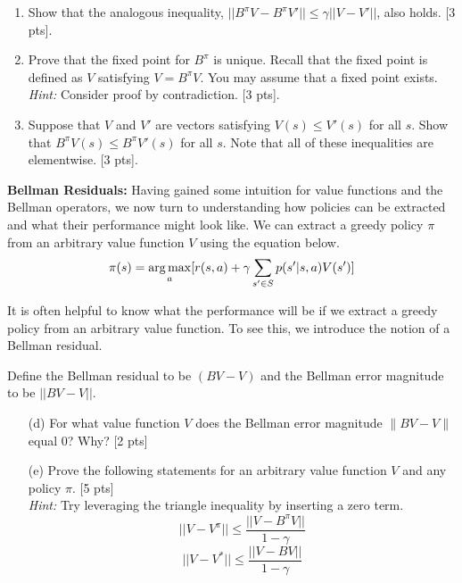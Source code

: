 \begin{enumerate}[label=(\alph*)]
    \item Show that the analogous inequality, $|| B^\pi V - B^\pi V' || \leq \gamma ||V - V'||$, also holds. [3 pts].
    
    \item Prove that the fixed point for $B^\pi$ is unique. Recall that the fixed point is defined as $V$ satisfying $V = B^\pi V$. You may assume that a fixed point exists. \textit{Hint:} Consider proof by contradiction. [3 pts].
    
    \item Suppose that $V$ and $V'$ are vectors satisfying $V(s) \leq V'(s)$ for all $s$. Show that $B^\pi V(s) \leq B^\pi V'(s)$ for all $s$. Note that all of these inequalities are elementwise. [3 pts].


\end{enumerate}




\noindent \textbf{Bellman Residuals:} Having gained some intuition for value functions and the Bellman operators, we now turn to understanding how policies can be extracted and what their performance might look like. We can extract a greedy policy $\pi$ from an arbitrary value function $V$ using the equation below. 
\begin{equation}
    \pi(s) = \operatorname*{arg\,max}_{a} [{r(s,a) + \gamma\sum_{s' \in S}p(s'|s,a)V(s')}]
\end{equation}

It is often helpful to know what the performance will be if we extract a greedy policy from an arbitrary value function. To see this, we introduce the notion of a Bellman residual.

Define the Bellman residual to be $(BV - V)$ and the Bellman error magnitude to be $||BV - V||$.

\begin{enumerate}
    \item[(d)] For what value function $V$ does the Bellman error magnitude $\|BV - V \|$ equal 0? Why? [2 pts]
    \item[(e)] Prove the following statements for an arbitrary value function $V$ and any policy $\pi$.  [5 pts]\\
    \textit{Hint:} Try leveraging the triangle inequality by inserting a zero term.
    \begin{equation}
        ||V - V^\pi|| \leq \frac{||V - B^\pi V||}{1-\gamma}
    \end{equation}
    \begin{equation}
        ||V - V^*|| \leq \frac{||V - BV||}{1-\gamma}
    \end{equation}
\end{enumerate}

